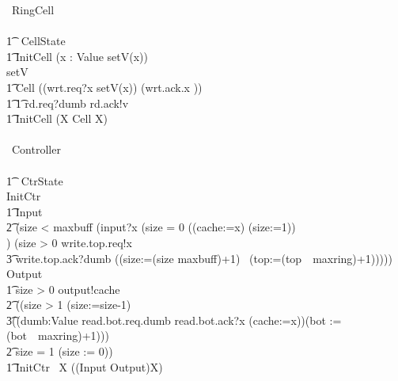 \documentclass[10pt]{article}
\begin{document}
\begin{circus}
\circprocess\ RingCell \circdef\\
\circbegin\\
\t1 \circstate\ CellState  \\
\t1 InitCell \circdef (\Intchoice x : Value \circspot setV(x)) \\
setV  \\
\t1 Cell \circdef ((wrt.req?x \then setV(x)) \circseq (wrt.ack.x \then \Skip))  \\
\t1 \t1         \extchoice rd.req?dumb \then rd.ack!v \then \Skip \\
\t1 \circspot InitCell \circseq (\circmu X \circspot Cell \circseq X)
\\
\circend
\\
\circprocess\ Controller \circdef \\
\circbegin\\
\t1 \circstate\ CtrState  \\

InitCtr  \\
\t1 Input \circdef \\
\t2 (\lcircguard size < maxbuff \rcircguard \circguard  (input?x \then (\lcircguard size = 0 \rcircguard \circguard ((cache:=x) \circseq (size:=1))\\
) \extchoice (\lcircguard size > 0 \rcircguard \circguard write.top.req!x \then \\
\t3 write.top.ack?dumb \then ((size:=(size \mod maxbuff)+1) \circseq\ (top:=(top~\mod~maxring)+1))))) \\
 Output \circdef \\
 \t1 \lcircguard size > 0 \rcircguard \circguard output!cache \then\\
 \t2 ((\lcircguard size > 1 \rcircguard \circguard (size:=size-1) \circseq \\
 \t3((\Intchoice dumb:Value \circspot read.bot.req.dumb \then read.bot.ack?x \then (cache:=x))\circseq (bot := (bot~\mod~maxring)+1)))\\
 \t2 \extchoice \lcircguard size = 1 \rcircguard \circguard (size := 0)) \\
\t1 \circspot InitCtr \circseq\ \circmu X \circspot ((Input \extchoice Output)\circseq X)
\\
\circend
\end{circus}%
\end{document}
